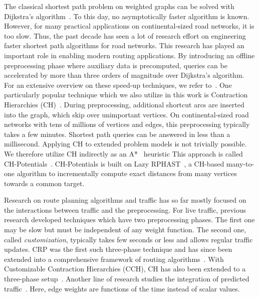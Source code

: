 \documentclass[a4paper,UKenglish,cleveref, autoref, thm-restate]{lipics-v2021}
\begin{document}
The classical shortest path problem on weighted graphs can be solved with Dijkstra's algorithm~\cite{d-ntpcg-59}.
To this day, no asymptotically faster algorithm is known.
However, for many practical applications on continental-sized road networks, it is too slow.
Thus, the past decade has seen a lot of research effort on engineering faster shortest path algorithms for road networks.
This research has played an important role in enabling modern routing applications.
By introducing an offline preprocessing phase where auxiliary data is precomputed, queries can be accelerated by more than three orders of magnitude over Dijkstra's algorithm.
For an extensive overview on these speed-up techniques, we refer to~\cite{bdgmpsww-rptn-16}.
One particularly popular technique which we also utilize in this work is Contraction Hierarchies (CH)~\cite{gssv-erlrn-12}.
During preprocessing, additional shortcut arcs are inserted into the graph, which skip over unimportant vertices.
On continental-sized road networks with tens of millions of vertices and edges, this preprocessing typically takes a few minutes.
Shortest path queries can be answered in less than a millisecond.
Applying CH to extended problem models is not trivially possible.
We therefore utilize CH indirectly as an A*~\cite{hnr-afbhd-68} heuristic
This approach is called CH-Potentials~\cite{strasser_et_al:LIPIcs.SEA.2021.6}.
CH-Potentials is built on Lazy RPHAST~\cite{strasser_et_al:LIPIcs.SEA.2021.6}, a CH-based many-to-one algorithm to incrementally compute exact distances from many vertices towards a common target.

Research on route planning algorithms and traffic has so far mostly focused on the interactions between traffic and the preprocessing.
For live traffic, previous research developed techniques which have two preprocessing phases.
The first one may be slow but must be independent of any weight function.
The second one, called \emph{customization}, typically takes few seconds or less and allows regular traffic updates.
CRP was the first such three-phase technique and has since been extended into a comprehensive framework of routing algorithms~\cite{bdgmpsww-rptn-16}.
With Customizable Contraction Hierarchies (CCH), CH has also been extended to a three-phase setup~\cite{dsw-cch-15}.
Another line of research studies the integration of predicted traffic~\cite{dn-crdtd-12,bgsv-mtdtt-13,bdpw-dtdrp-16,swz-sfert-21}.
Here, edge weights are functions of the time instead of scalar values.
\end{document}
